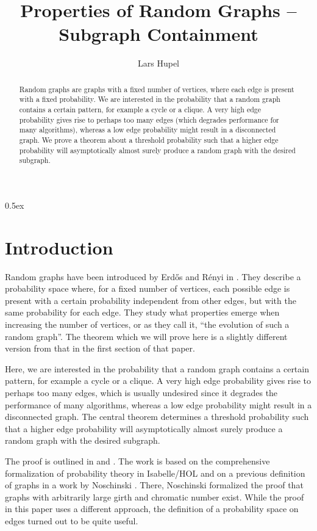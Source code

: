 \documentclass[11pt,a4paper]{article}
\theoremstyle{normalfont}
\begin{document}
\title{Properties of Random Graphs -- Subgraph Containment}
\author{Lars Hupel}
\maketitle

  \begin{abstract}
    Random graphs are graphs with a fixed number of vertices, where each edge is present with a fixed probability.
    We are interested in the probability that a random graph contains a certain pattern, for example a cycle or a clique.
    A very high edge probability gives rise to perhaps too many edges (which degrades performance for many algorithms), whereas a low edge probability might result in a disconnected graph.
    We prove a theorem about a threshold probability such that a higher edge probability will asymptotically almost surely produce a random graph with the desired subgraph.
  \end{abstract}

\tableofcontents

\newpage

\parindent 0pt\parskip 0.5ex

\section{Introduction}

Random graphs have been introduced by Erd\H{o}s and R\'enyi in \cite{erdos}.
They describe a probability space where, for a fixed number of vertices, each possible edge is present with a certain probability independent from other edges, but with the same probability for each edge.
They study what properties emerge when increasing the number of vertices, or as they call it, ``the evolution of such a random graph''.
The theorem which we will prove here is a slightly different version from that in the first section of that paper.

Here, we are interested in the probability that a random graph contains a certain pattern, for example a cycle or a clique.
A very high edge probability gives rise to perhaps too many edges, which is usually undesired since it degrades the performance of many algorithms, whereas a low edge probability might result in a disconnected graph.
The central theorem determines a threshold probability such that a higher edge probability will asymptotically almost surely produce a random graph with the desired subgraph.

The proof is outlined in \cite[\S\ 11.4]{graph-theory} and \cite[\S\ 3]{random-graphs}.
The work is based on the comprehensive formalization of probability theory in Isabelle/HOL and on a previous definition of graphs in a work by Noschinski \cite{girth-chromatic-afp}.
There, Noschinski formalized the proof that graphs with arbitrarily large girth and chromatic number exist.
While the proof in this paper uses a different approach, the definition of a probability space on edges turned out to be quite useful. 






\end{document}
